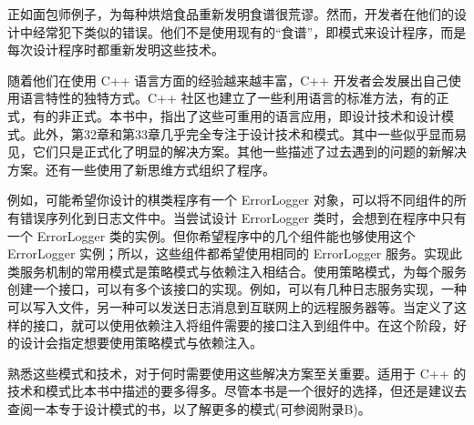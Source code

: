 正如面包师例子，为每种烘焙食品重新发明食谱很荒谬。然而，开发者在他们的设计中经常犯下类似的错误。他们不是使用现有的“食谱”，即模式来设计程序，而是每次设计程序时都重新发明这些技术。

随着他们在使用 C++ 语言方面的经验越来越丰富，C++ 开发者会发展出自己使用语言特性的独特方式。C++ 社区也建立了一些利用语言的标准方法，有的正式，有的非正式。本书中，指出了这些可重用的语言应用，即设计技术和设计模式。此外，第32章和第33章几乎完全专注于设计技术和模式。其中一些似乎显而易见，它们只是正式化了明显的解决方案。其他一些描述了过去遇到的问题的新解决方案。还有一些使用了新思维方式组织了程序。

例如，可能希望你设计的棋类程序有一个 ErrorLogger 对象，可以将不同组件的所有错误序列化到日志文件中。当尝试设计 ErrorLogger 类时，会想到在程序中只有一个 ErrorLogger 类的实例。但你希望程序中的几个组件能也够使用这个 ErrorLogger 实例；所以，这些组件都希望使用相同的 ErrorLogger 服务。实现此类服务机制的常用模式是策略模式与依赖注入相结合。使用策略模式，为每个服务创建一个接口，可以有多个该接口的实现。例如，可以有几种日志服务实现，一种可以写入文件，另一种可以发送日志消息到互联网上的远程服务器等。当定义了这样的接口，就可以使用依赖注入将组件需要的接口注入到组件中。在这个阶段，好的设计会指定想要使用策略模式与依赖注入。

熟悉这些模式和技术，对于何时需要使用这些解决方案至关重要。适用于 C++ 的技术和模式比本书中描述的要多得多。尽管本书是一个很好的选择，但还是建议去查阅一本专于设计模式的书，以了解更多的模式(可参阅附录B)。



















